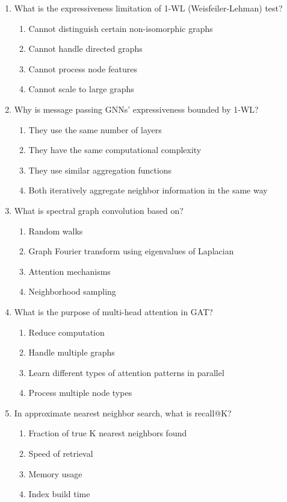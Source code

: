 \documentclass[12pt,a4paper]{article}
\begin{document}
\begin{enumerate}
\item What is the expressiveness limitation of 1-WL (Weisfeiler-Lehman) test?
\begin{enumerate}[label=\Alph*)]
    \item Cannot distinguish certain non-isomorphic graphs
    \item Cannot handle directed graphs
    \item Cannot process node features
    \item Cannot scale to large graphs
\end{enumerate}

\item Why is message passing GNNs' expressiveness bounded by 1-WL?
\begin{enumerate}[label=\Alph*)]
    \item They use the same number of layers
    \item They have the same computational complexity
    \item They use similar aggregation functions
    \item Both iteratively aggregate neighbor information in the same way
\end{enumerate}

\item What is spectral graph convolution based on?
\begin{enumerate}[label=\Alph*)]
    \item Random walks
    \item Graph Fourier transform using eigenvalues of Laplacian
    \item Attention mechanisms
    \item Neighborhood sampling
\end{enumerate}

\item What is the purpose of multi-head attention in GAT?
\begin{enumerate}[label=\Alph*)]
    \item Reduce computation
    \item Handle multiple graphs
    \item Learn different types of attention patterns in parallel
    \item Process multiple node types
\end{enumerate}

\item In approximate nearest neighbor search, what is recall@K?
\begin{enumerate}[label=\Alph*)]
    \item Fraction of true K nearest neighbors found
    \item Speed of retrieval
    \item Memory usage
    \item Index build time
\end{enumerate}


\end{enumerate}
\end{document}
